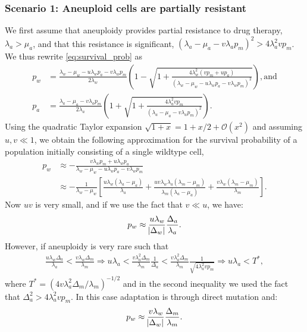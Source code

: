 \documentclass[12pt]{extarticle}
\begin{document}
\begin{appendices}
\subsubsection*{Scenario 1: Aneuploid cells are partially resistant} 

We first assume that aneuploidy provides partial resistance to drug therapy, $\lambda_a>\mu_a$, and that this resistance is significant, $\left(\lambda_a-\mu_a-v\lambda_ap_m\right)^2 > 4\lambda_a^2 v p_m$.
We thus rewrite \cref{eq:survival_prob} as
\begin{align*}
p_w&=\frac{\lambda_w-\mu_w-u\lambda_wp_a-v\lambda_wp_m}{2\lambda_w}\left(1-\sqrt{1+\frac{4\lambda_w^2\left(vp_m+up_a\right)}{\left(\lambda_w-\mu_w-u\lambda_wp_a-v\lambda_wp_m\right)^2}}\right) ,
\text{and} \\
p_a&=\frac{\lambda_a-\mu_a-v\lambda_ap_m}{2\lambda_a}\left(1+\sqrt{1+\frac{4\lambda_a^2vp_m}{\left(\lambda_a-\mu_a-v\lambda_ap_m\right)^2}}\right) . 
\end{align*}
Using the quadratic Taylor expansion $\sqrt{1+x}=1+x/2+\mathcal{O}(x^2)$ and assuming $u,v \ll 1$,
we obtain the following approximation for the survival probability of a population initially consisting of a single wildtype cell,
\begin{align} \label{eq:survprobwapprox1}
p_w 
&\approx -\frac{v\lambda_wp_m+u\lambda_wp_a}{\lambda_w-\mu_w-u\lambda_wp_a-v\lambda_wp_m}\\
\nonumber
&\approx-\frac{1}{\lambda_w-\mu_w}\left[\frac{u\lambda_w\left(\lambda_a-\mu_a\right)}{\lambda_a}+\frac{uv\lambda_w\lambda_a\left(\lambda_m-\mu_m\right)}{\lambda_m\left(\lambda_a-\mu_a\right)}+\frac{v\lambda_w\left(\lambda_m-\mu_m\right)}{\lambda_m}\right].
\end{align}
Now $u v$ is very small, and if we use the fact that $v \ll u$, we have:
\begin{equation}\label{eq:pw_parttolerant}
p_w \approx \frac{u\lambda_w}{\abs{\Delta_w}}  \frac{\Delta_a}{\lambda_a} .
\end{equation}
However, if aneuploidy is very rare such that
\begin{align*}
\frac{u\lambda_w\Delta_a}{\lambda_a}<\frac{v\lambda_w\Delta_m}{\lambda_m}\Rightarrow u\lambda_a<\frac{v\lambda_a^2\Delta_m}{\lambda_m} \frac{1}{\Delta_a}<\frac{v\lambda_a^2\Delta_m}{\lambda_m} \frac{1}{\sqrt{4\lambda_a^2 v p_m}}\Rightarrow u\lambda_a<T^*,
\end{align*}
where $T^* = (4 v \lambda_a^2 \Delta_m/\lambda_m)^{-1/2}$ and in the second inequality we used the fact that $\Delta_a^2 > 4\lambda_a^2 v p_m$. In this case adaptation is through direct mutation and:
\begin{equation*}
p_w \approx \frac{v\lambda_w}{\abs{\Delta_w}}  \frac{\Delta_m}{\lambda_m} .
\end{equation*}

\end{appendices}
\end{document}
